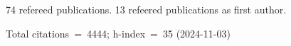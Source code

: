 74 refereed publications. 13 refeered publications as first author.

Total citations~=~4444; h-index~=~35 (2024-11-03)
